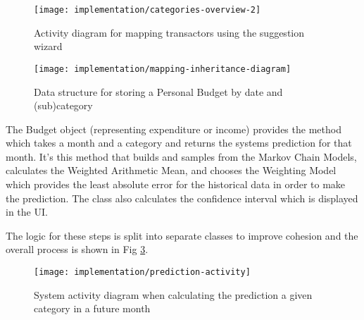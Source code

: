 \begin{figure}[h]
    \centering
    \texttt{[image: implementation/categories-overview-2]}
    \caption{Activity diagram for mapping transactors using the suggestion wizard}
    \label{fig:imp-categories-overview}
\end{figure}

\begin{figure}[h]
    \centering
    \texttt{[image: implementation/mapping-inheritance-diagram]}
    \caption{Data structure for storing a Personal Budget by date and (sub)category}
    \label{fig:prediction-inheritance-diagram}
    
    \begin{comment}
[PersonalBudget]<>1-2>[Budget]
[<<Abstract>> CategoryCollection]^-[Budget]
[<<Interface>>;TransactionCollection]^-[Budget]
[<<Abstract>>;CategoryCollection]^-[TransactionDateCollection]
[<<Interface>>;TransactionCollection]^-[TransactionDateCollection]
[Budget]<>1-0..*>[TransactionDateCollection]
[<<Abstract>>;CategoryCollection]^-[TransactionCategoryCollection]
[<<Interface>>;TransactionCollection]^-[TransactionCategoryCollection]
[TransactionDateCollection]<>1-0..*>[TransactionCategoryCollection]
[<<Abstract>>;CategoryCollection]^-[TransactionSubCategoryCollection]
[<<Interface>>;TransactionCollection]^-[TransactionSubCategoryCollection]
[TransactionCategoryCollection]<>1-0..*>[TransactionSubCategoryCollection]
[TransactionSubCategoryCollection]<>1-0..*>[Transaction]
    \end{comment}
\end{figure}

The Budget object (representing expenditure or income) provides the  method which takes a month and a category and returns the systems prediction for that month. It's this method that builds and samples from the Markov Chain Models, calculates the Weighted Arithmetic Mean, and chooses the Weighting Model which provides the least absolute error for the historical data in order to make the prediction. The class also calculates the confidence interval which is displayed in the UI.

The logic for these steps is split into separate classes to improve cohesion and the overall process is shown in Fig \ref{fig:prediction-activity}. 

\begin{figure}[h]
    \centering
    \texttt{[image: implementation/prediction-activity]}
    \caption{System activity diagram when calculating the prediction a given category in a future month}
    \label{fig:prediction-activity}
    
    \begin{comment}
(start)->|a|
|a|->[Markov Chain]->(Build MCMs)->(Sample from MCMs)->|b|
|a|->[Weighted Average Calculator]->(Select Weighting Model)->(Calculate Weighted Averages)->|b|
|b|->[Prediction Evaluator]->(Calculate Average and Confidence)->(end)
    \end{comment}
\end{figure}

